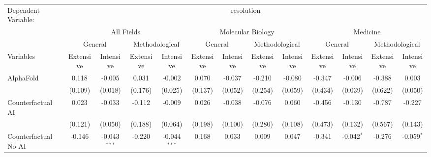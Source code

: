 \begingroup
\centering
\begin{tabular}{lcccccccccccc}
   \tabularnewline \midrule \midrule
   Dependent Variable: & \multicolumn{12}{c}{resolution}\\
 & \multicolumn{4}{c}{All Fields} & \multicolumn{4}{c}{Molecular Biology} & \multicolumn{4}{c}{Medicine} \\
\cmidrule(lr){2-5} \cmidrule(lr){6-9} \cmidrule(lr){10-13}
 & \multicolumn{2}{c}{General} & \multicolumn{2}{c}{Methodological} & \multicolumn{2}{c}{General} & \multicolumn{2}{c}{Methodological} & \multicolumn{2}{c}{General} & \multicolumn{2}{c}{Methodological} \\
\cmidrule(lr){2-3} \cmidrule(lr){4-5} \cmidrule(lr){6-7} \cmidrule(lr){8-9} \cmidrule(lr){10-11} \cmidrule(lr){12-13}
Variables & \multicolumn{1}{c}{Extensive} & \multicolumn{1}{c}{Intensive} & \multicolumn{1}{c}{Extensive} & \multicolumn{1}{c}{Intensive} & \multicolumn{1}{c}{Extensive} & \multicolumn{1}{c}{Intensive} & \multicolumn{1}{c}{Extensive} & \multicolumn{1}{c}{Intensive} & \multicolumn{1}{c}{Extensive} & \multicolumn{1}{c}{Intensive} & \multicolumn{1}{c}{Extensive} & \multicolumn{1}{c}{Intensive} \\
\cmidrule(lr){1-1}\cmidrule(lr){2-2} \cmidrule(lr){3-3} \cmidrule(lr){4-4} \cmidrule(lr){5-5} \cmidrule(lr){6-6} \cmidrule(lr){7-7} \cmidrule(lr){8-8} \cmidrule(lr){9-9} \cmidrule(lr){10-10} \cmidrule(lr){11-11} \cmidrule(lr){12-12} \cmidrule(lr){13-13}
   AlphaFold                                & 0.118   & -0.005         & 0.031   & -0.002         & 0.070   & -0.037  & -0.210  & -0.080  & -0.347  & -0.006       & -0.388  & 0.003\\   
                                            & (0.109) & (0.018)        & (0.176) & (0.025)        & (0.137) & (0.052) & (0.254) & (0.059) & (0.434) & (0.039)      & (0.622) & (0.050)\\   
   Counterfactual AI                        & 0.023   & -0.033         & -0.112  & -0.009         & 0.026   & -0.038  & -0.076  & 0.060   & -0.456  & -0.130       & -0.787  & -0.227\\   
                                            & (0.121) & (0.050)        & (0.188) & (0.064)        & (0.198) & (0.100) & (0.280) & (0.108) & (0.473) & (0.132)      & (0.567) & (0.143)\\   
   Counterfactual No AI                     & -0.146  & -0.043$^{***}$ & -0.220  & -0.044$^{***}$ & 0.168   & 0.033   & 0.009   & 0.047   & -0.341  & -0.042$^{*}$ & -0.276  & -0.059$^{*}$\\   

\end{tabular}
